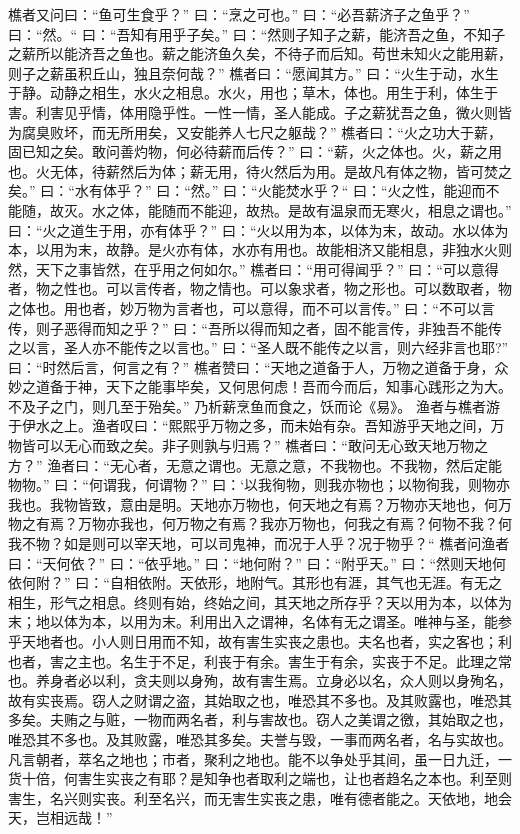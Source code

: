 \documentclass[12pt,UTF8]{ctexbook}
\begin{document}
樵者又问曰：“鱼可生食乎？”
曰：“烹之可也。”
曰：“必吾薪济子之鱼乎？”
曰：“然。“
曰：“吾知有用乎子矣。”
曰：“然则子知子之薪，能济吾之鱼，不知子之薪所以能济吾之鱼也。薪之能济鱼久矣，不待子而后知。苟世未知火之能用薪，则子之薪虽积丘山，独且奈何哉？”
樵者曰：“愿闻其方。”
曰：“火生于动，水生于静。动静之相生，水火之相息。水火，用也；草木，体也。用生于利，体生于害。利害见乎情，体用隐乎性。一性一情，圣人能成。子之薪犹吾之鱼，微火则皆为腐臭败坏，而无所用矣，又安能养人七尺之躯哉？”
樵者曰：“火之功大于薪，固已知之矣。敢问善灼物，何必待薪而后传？”
曰：“薪，火之体也。火，薪之用也。火无体，待薪然后为体；薪无用，待火然后为用。是故凡有体之物，皆可焚之矣。”
曰：“水有体乎？”
曰：“然。”
曰：“火能焚水乎？“
曰：“火之性，能迎而不能随，故灭。水之体，能随而不能迎，故热。是故有温泉而无寒火，相息之谓也。”
曰：“火之道生于用，亦有体乎？”
曰：“火以用为本，以体为末，故动。水以体为本，以用为末，故静。是火亦有体，水亦有用也。故能相济又能相息，非独水火则然，天下之事皆然，在乎用之何如尔。”
樵者曰：“用可得闻乎？”
曰：“可以意得者，物之性也。可以言传者，物之情也。可以象求者，物之形也。可以数取者，物之体也。用也者，妙万物为言者也，可以意得，而不可以言传。”
曰：“不可以言传，则子恶得而知之乎？”
曰：“吾所以得而知之者，固不能言传，非独吾不能传之以言，圣人亦不能传之以言也。”
曰：“圣人既不能传之以言，则六经非言也耶?”
曰：“时然后言，何言之有？”
樵者赞曰：“天地之道备于人，万物之道备于身，众妙之道备于神，天下之能事毕矣，又何思何虑！吾而今而后，知事心践形之为大。不及子之门，则几至于殆矣。”
乃析薪烹鱼而食之，饫而论《易》。
渔者与樵者游于伊水之上。渔者叹曰：“熙熙乎万物之多，而未始有杂。吾知游乎天地之间，万物皆可以无心而致之矣。非子则孰与归焉？”
樵者曰：“敢问无心致天地万物之方？”
渔者曰：“无心者，无意之谓也。无意之意，不我物也。不我物，然后定能物物。”
曰：“何谓我，何谓物？”
曰：‘以我徇物，则我亦物也；以物徇我，则物亦我也。我物皆致，意由是明。天地亦万物也，何天地之有焉？万物亦天地也，何万物之有焉？万物亦我也，何万物之有焉？我亦万物也，何我之有焉？何物不我？何我不物？如是则可以宰天地，可以司鬼神，而况于人乎？况于物乎？“
樵者问渔者曰：“天何依？”
曰：“依乎地。”
曰：“地何附？”
曰：“附乎天。”
曰：“然则天地何依何附？”
曰：“自相依附。天依形，地附气。其形也有涯，其气也无涯。有无之相生，形气之相息。终则有始，终始之间，其天地之所存乎？天以用为本，以体为末；地以体为本，以用为末。利用出入之谓神，名体有无之谓圣。唯神与圣，能参乎天地者也。小人则日用而不知，故有害生实丧之患也。夫名也者，实之客也；利也者，害之主也。名生于不足，利丧于有余。害生于有余，实丧于不足。此理之常也。养身者必以利，贪夫则以身殉，故有害生焉。立身必以名，众人则以身殉名，故有实丧焉。窃人之财谓之盗，其始取之也，唯恐其不多也。及其败露也，唯恐其多矣。夫贿之与赃，一物而两名者，利与害故也。窃人之美谓之徼，其始取之也，唯恐其不多也。及其败露，唯恐其多矣。夫誉与毁，一事而两名者，名与实故也。凡言朝者，萃名之地也；市者，聚利之地也。能不以争处乎其间，虽一日九迁，一货十倍，何害生实丧之有耶？是知争也者取利之端也，让也者趋名之本也。利至则害生，名兴则实丧。利至名兴，而无害生实丧之患，唯有德者能之。天依地，地会天，岂相远哉！”
\end{document}
